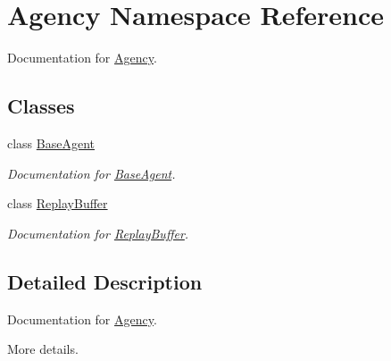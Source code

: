 \hypertarget{namespaceAgency}{}\section{Agency Namespace Reference}
\label{namespaceAgency}


Documentation for \mbox{\hyperlink{namespaceAgency}{Agency}}.  


\subsection*{Classes}
\begin{DoxyCompactItemize}
\item 
class \mbox{\hyperlink{classAgency_1_1BaseAgent}{Base\+Agent}}
\begin{DoxyCompactList}\small\item\em Documentation for \mbox{\hyperlink{classAgency_1_1BaseAgent}{Base\+Agent}}. \end{DoxyCompactList}\item 
class \mbox{\hyperlink{classAgency_1_1ReplayBuffer}{Replay\+Buffer}}
\begin{DoxyCompactList}\small\item\em Documentation for \mbox{\hyperlink{classAgency_1_1ReplayBuffer}{Replay\+Buffer}}. \end{DoxyCompactList}\end{DoxyCompactItemize}


\subsection{Detailed Description}
Documentation for \mbox{\hyperlink{namespaceAgency}{Agency}}. 

More details. 